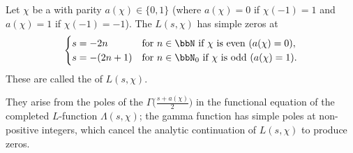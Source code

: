 \begin{corollary} \label{corollary:trivial_zeros_of_dirichlet_L_function}
Let $\chi$ be a  with parity $a(\chi) \in \{0,1\}$ (where $a(\chi)=0$ if $\chi(-1)=1$ and $a(\chi)=1$ if $\chi(-1)=-1$). The  $L(s, \chi)$ has simple zeros at
$$
\begin{cases}
s = -2n & \text{for } n \in \bbN \text{ if } \chi \text{ is even } (a(\chi)=0), \\
s = -(2n+1) & \text{for } n \in \bbN_0 \text{ if } \chi \text{ is odd } (a(\chi)=1).
\end{cases}
$$
These are called the  of $L(s, \chi)$.

They arise from the poles of the  $\Gamma\!\big(\frac{s + a(\chi)}{2}\big)$ in the functional equation of the completed $L$-function $\Lambda(s, \chi)$; the gamma function has simple poles at non-positive integers, which cancel the analytic continuation of $L(s, \chi)$ to produce zeros.
\end{corollary}

